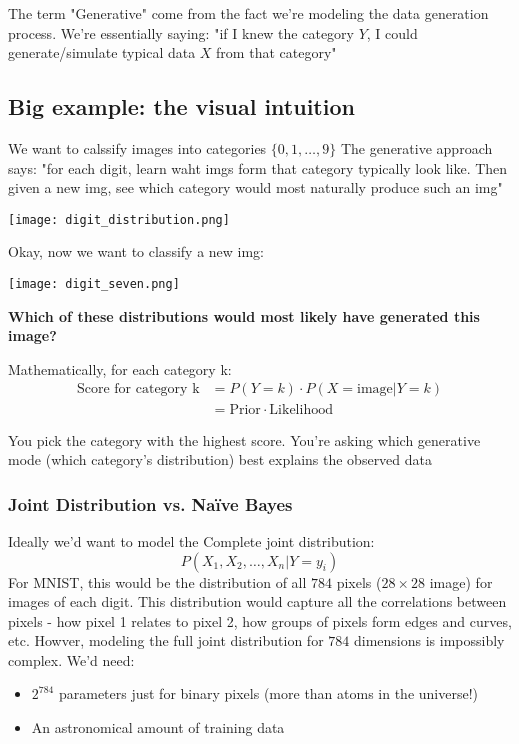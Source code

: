 The term "Generative" come from the fact we're modeling the data generation process. We're essentially saying: "if I knew the category $Y$, I could generate/simulate typical data $X$ from that category"

\subsection{Big example: the visual intuition}
We want to calssify images into categories $\{0,1,\dots,9\}$ The generative approach says: "for each digit, learn waht imgs form that category typically look like. Then given a new img, see which category would most naturally produce such an img"

\begin{center}
    \texttt{[image: digit\_distribution.png]}
\end{center}

Okay, now we want to classify a new img:
\begin{center}
    \texttt{[image: digit\_seven.png]}
\end{center}
\textbf{Which of these distributions would most likely have generated this image?}

Mathematically, for each category k:
\[
    \begin{aligned}
        \text{Score for category k} &= P(Y = k) \cdot P(X = \text{image} | Y = k)\\
                     &= \text{Prior} \cdot \text{Likelihood}
    \end{aligned}
\]

You pick the category with the highest score. You're asking which generative mode (which category's distribution) best explains the observed data


\subsubsection{Joint Distribution vs. Naïve Bayes}
Ideally we'd want to model the Complete joint distribution:
\[
    P(X_1, X_2, \dots, X_n | Y = y_i)
\]
For MNIST, this would be the distribution of all $784$ pixels ($28\times 28$ image) for images of each digit. This distribution would capture all the correlations between pixels - how pixel 1 relates to pixel 2, how groups of pixels form edges and curves, etc. Howver, modeling the full joint distribution for $784$ dimensions is impossibly complex. We'd need:
\begin{itemize}
    \item $2^{784}$ parameters just for binary pixels (more than atoms in the universe!)
    \item An astronomical amount of training data
\end{itemize}

